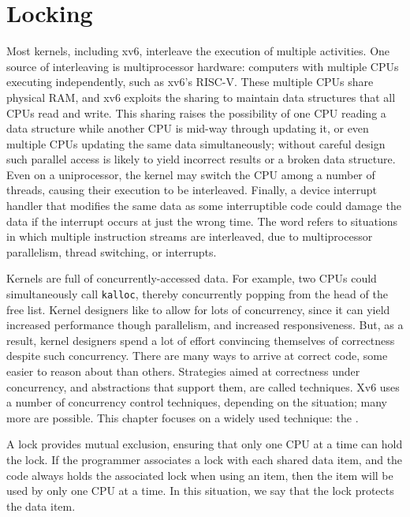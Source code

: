 \chapter{Locking}
\label{CH:LOCK}

Most kernels, including xv6, interleave the execution
of multiple activities.
One source of interleaving is multiprocessor hardware:
computers with
multiple CPUs executing independently, such as xv6's RISC-V.
These multiple CPUs share physical RAM,
and xv6 exploits the sharing to maintain
data structures that all CPUs read and write.
This sharing raises the possibility of
one CPU reading a data structure while another
CPU is mid-way through updating it, or even
multiple CPUs updating the same data simultaneously;
without careful design such parallel access is likely
to yield incorrect results or a broken data structure.
Even on a uniprocessor, the kernel may switch the CPU among
a number of threads, causing their execution to be interleaved.
Finally, a device interrupt handler that modifies
the same data as some interruptible code could damage
the data if the interrupt occurs at just the wrong time.
The word 
refers to situations in which
multiple instruction streams are interleaved,
due to multiprocessor parallelism,
thread switching, or interrupts.

Kernels are full of concurrently-accessed data. For example, two CPUs
could simultaneously call {\tt kalloc}, thereby concurrently
popping from the head of the free list. Kernel designers like to allow
for lots of concurrency, since it can yield increased performance
though parallelism, and increased responsiveness. But, as a result,
kernel designers spend a lot of effort convincing themselves of
correctness despite such concurrency. There are many ways to arrive at
correct code, some easier to reason about than others. Strategies
aimed at correctness under concurrency, and abstractions that support
them, are called  techniques. Xv6 uses
a number of concurrency control techniques, depending on the
situation; many more are possible. This chapter focuses on a widely
used technique: the .

A lock provides mutual exclusion, ensuring that only one CPU at a time can hold
the lock. If the programmer associates a lock with each shared data item,
and the code always holds the associated lock when using an item,
then the item will be used by only one CPU at a time.
In this situation, we say that the lock protects the data item.

